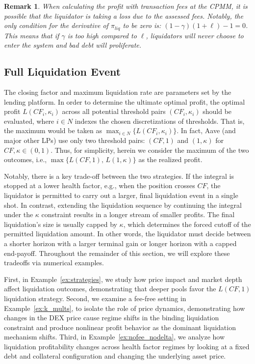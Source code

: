 \documentclass[11pt]{article} %
\newtheorem{remark}{Remark}
\begin{document}
\begin{remark}
When calculating the profit with transaction fees at the CPMM, it is possible that the liquidator is taking a loss due to the assessed fees. Notably, the only condition for the derivative of $\pi_{liq}$ to be zero is: $(1-\gamma)(1+\ell)-1=0$.  This means that if $\gamma$ is too high compared to $\ell$, liquidators will never choose to enter the system and bad debt will proliferate.
\end{remark}
\subsection{Full Liquidation Event}\label{sec:optimiz-full}
The closing factor and maximum liquidation rate are parameters set by the lending platform. In order to determine the ultimate optimal profit, the optimal profit $L(CF_i,\kappa_i)$ across all potential threshold pairs $(CF_i, \kappa_i)$ should be evaluated, where $i\in N$ indexes the chosen discretizations of thresholds. That is, the maximum would be taken as $\max_{i\in N}\{L(CF_i, \kappa_i)\}$.
In fact, Aave (and major other LPs) use only two threshold pairs: $(CF,1)$ and $(1,\kappa)$ for $CF,\kappa \in (0,1)$. Thus, for simplicity, herein we consider the maximum of the two outcomes, i.e., $\max\{L(CF, 1),\, L(1, \kappa)\}$ as the realized profit.

Notably, there is a key trade-off between the two strategies. If the integral is stopped at a lower health factor, e.g., when the position crosses $CF$, the liquidator is permitted to carry out a larger, final liquidation event in a single shot. In contrast, extending the liquidation sequence by continuing the integral under the $\kappa$ constraint results in a longer stream of smaller profits. The final liquidation's size is usually capped by $\kappa$, which determines the forced cutoff of the permitted liquidation amount. In other words, the liquidator must decide between a shorter horizon with a larger terminal gain or longer horizon with a capped end-payoff. Throughout the remainder of this section, we will explore these tradeoffs via numerical examples.

First, in Example~\ref{ex:strategies}, we study how price impact and market depth affect liquidation outcomes, demonstrating that deeper pools favor the $L(CF,1)$ liquidation strategy. 
Second, we examine a fee-free setting in Example~\ref{ex:k_mults}, to isolate the role of price dynamics, demonstrating how changes in the DEX price cause regime shifts in the binding liquidation constraint and produce nonlinear profit behavior as the dominant liquidation mechanism shifts. Third, in Example~\ref{ex:nofee_nodelta}, we analyze how liquidation profitability changes across health factor regimes by looking at a fixed debt and collateral configuration and changing the underlying asset price.
\end{document}
